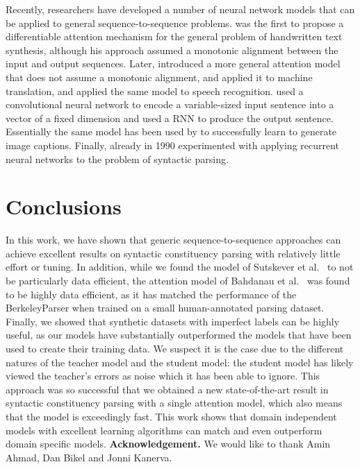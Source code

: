 \documentclass{article} \usepackage{nips15submit_e,times}
\begin{document}
Recently, researchers have developed a number of neural network models that
can be applied to general sequence-to-sequence problems.
\cite{graves2013generating} was the first to propose a differentiable attention
mechanism for the general problem of handwritten text synthesis, although his
approach assumed a monotonic alignment between the input and output sequences.
Later, \cite{bahdanau2014neural}
introduced a more general attention model that does not assume a monotonic
alignment, and applied it to machine translation, and
\cite{chorowski2014end} applied the same model to speech
recognition.  \cite{kalchbrenner2013recurrent} used a convolutional
neural network to encode a variable-sized input sentence into
a vector of a fixed dimension and used a RNN to produce the output sentence.
Essentially the same model has been used by \cite{vinyals2014show} to
successfully learn to generate image captions.
Finally, already in 1990 \cite{zoubin} experimented with
applying recurrent neural networks to the problem of syntactic parsing.
 \vspace{-0mm}
\section{Conclusions}
\label{sec:concl}

In this work, we have shown that generic sequence-to-sequence
approaches can achieve excellent results on syntactic constituency
parsing with relatively little effort or tuning.  In addition, while
we found the model of Sutskever et al.~\cite{sutskever14} to not be
particularly data efficient, the attention model of Bahdanau et
al.~\cite{bahdanau2014neural} was found to be highly data efficient,
as it has matched the performance of the BerkeleyParser when trained
on a small human-annotated parsing dataset.  Finally, we showed that
synthetic datasets with imperfect labels can be highly useful, as our
models have substantially outperformed the models that have been used
to create their training data.  We suspect it is the case due to the
different natures of the teacher model and the student model: the
student model has likely viewed the teacher's errors as noise which it
has been able to ignore.  This approach was so successful that we
obtained a new state-of-the-art result in syntactic constituency
parsing with a single attention model, which also means that the model
is exceedingly fast.  This work shows that domain independent models
with excellent learning algorithms can match and even outperform
domain specific models. 
\vspace{-0mm}
{\bf Acknowledgement.} We would like to thank Amin Ahmad, Dan Bikel and Jonni Kanerva.

\vspace{-3mm}


\end{document}
